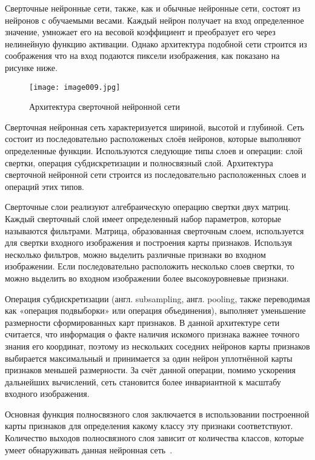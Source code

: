 Сверточные нейронные сети, также, как и обычные нейронные сети, состоят из нейронов с обучаемыми весами. Каждый нейрон получает на вход определенное значение, умножает его на весовой коэффициент и преобразует его через нелинейную функцию активации. Однако архитектура подобной сети строится из соображения что на вход подаются пиксели изображения, как показано на рисунке ниже. 

\begin{figure}[htbp]
\centering
\texttt{[image: image009.jpg]}
\caption{Архитектура сверточной нейронной сети~\cite{eleven}}%
\label{fig:how-to-do-research}
\end{figure}

Сверточная нейронная сеть характеризуется шириной, высотой и глубиной. Сеть состоит из последовательно расположеных слоёв нейронов, которые выполняют определенные функции. Используются следующие типы слоев и операции: слой свертки, операция субдискретизации и полносвязный слой. Архитектура сверточной нейронной сети строится из последовательно расположенных слоев и операций этих типов.

Сверточные слои реализуют алгебраическую операцию свертки двух матриц. Каждый сверточный слой имеет определенный набор параметров, которые называются фильтрами. Матрица, образованная сверточным слоем, используется для свертки входного изображения и построения карты признаков. Используя несколько фильтров, можно выделить различные признаки во входном изображении. Если последовательно расположить несколько слоев свертки, то можно выделить во входном изображении более высокоуровневые признаки.

Операция субдискретизации (англ. subsampling, англ. pooling, также переводимая как «операция подвыборки» или операция объединения), выполняет уменьшение размерности сформированных карт признаков. В данной архитектуре сети считается, что информация о факте наличия искомого признака важнее точного знания его координат, поэтому из нескольких соседних нейронов карты признаков выбирается максимальный и принимается за один нейрон уплотнённой карты признаков меньшей размерности. За счёт данной операции, помимо ускорения дальнейших вычислений, сеть становится более инвариантной к масштабу входного изображения.

Основная функция полносвязного слоя заключается в использовании построенной карты признаков для определения какому классу эту признаки соответствуют. Количество выходов полносвязного слоя зависит от количества классов, которые умеет обнаруживать данная нейронная сеть~\cite{twelve}.

